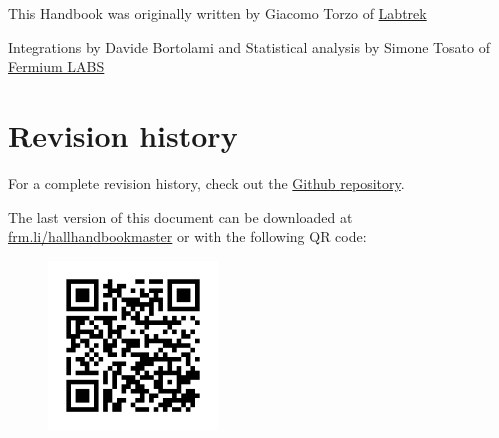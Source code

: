 \documentclass[]{book}
\begin{document}
This Handbook was originally written by Giacomo Torzo of
\href{http://labtrek.it}{Labtrek}

Integrations by Davide Bortolami and Statistical analysis by Simone
Tosato of \href{http://fermiumlabs.com}{Fermium LABS}

\section{Revision history}\label{revision-history}

For a complete revision history, check out the
\href{https://github.com/fermiumlabs/Hall-effect-apparatus/commits/master}{Github
repository}.

The last version of this document can be downloaded at
\href{https://frm.li/hallhandbookmaster}{frm.li/hallhandbookmaster} or
with the following QR code:

\begin{figure}
\centering
\includegraphics[width=0.40000\textwidth]{Assets/Figures/qr_last.jpg}
\caption{}
\end{figure}
\end{document}
